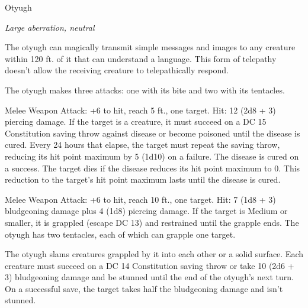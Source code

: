 \begin{monsterbox}{Otyugh}
\begin{hangingpar}
\textit{Large aberration, neutral}
\end{hangingpar}
\dndline%
\basics[%
armorclass = 14,
hitpoints = 12d10 + 48,
speed = {30 ft.}
]
\dndline%
\stats[%
STR = \stat{16},
DEX = \stat{11},
CON = \stat{19},
INT = \stat{6},
WIS = \stat{13},
CHA = \stat{6}
]
\dndline%
\details[%
skills={},
damageimmunities={},
savingthrows={Con +7, },
conditionimmunities={},
damageresistances={},
damagevulnerabilities={},
senses={darkvision 120 ft., passive Perception 11},
languages={Otyugh},
challenge=5
]
\dndline%
\begin{monsteraction}
The otyugh can magically transmit simple messages and images to any creature within 120 ft. of it that can understand a language. This form of telepathy doesn't allow the receiving creature to telepathically respond.
\end{monsteraction}
\begin{monsteraction}[Multiattack]
The otyugh makes three attacks: one with its bite and two with its tentacles.
\end{monsteraction}
\begin{monsteraction}[Bite]
Melee Weapon Attack: +6 to hit, reach 5 ft., one target. Hit: 12 (2d8 + 3) piercing damage. If the target is a creature, it must succeed on a DC 15 Constitution saving throw against disease or become poisoned until the disease is cured. Every 24 hours that elapse, the target must repeat the saving throw, reducing its hit point maximum by 5 (1d10) on a failure. The disease is cured on a success. The target dies if the disease reduces its hit point maximum to 0. This reduction to the target's hit point maximum lasts until the disease is cured.
\end{monsteraction}
\begin{monsteraction}[Tentacle]
Melee Weapon Attack: +6 to hit, reach 10 ft., one target. Hit: 7 (1d8 + 3) bludgeoning damage plus 4 (1d8) piercing damage. If the target is Medium or smaller, it is grappled (escape DC 13) and restrained until the grapple ends. The otyugh has two tentacles, each of which can grapple one target.
\end{monsteraction}
\begin{monsteraction}
The otyugh slams creatures grappled by it into each other or a solid surface. Each creature must succeed on a DC 14 Constitution saving throw or take 10 (2d6 + 3) bludgeoning damage and be stunned until the end of the otyugh's next turn. On a successful save, the target takes half the bludgeoning damage and isn't stunned.
\end{monsteraction}
\end{monsterbox}
